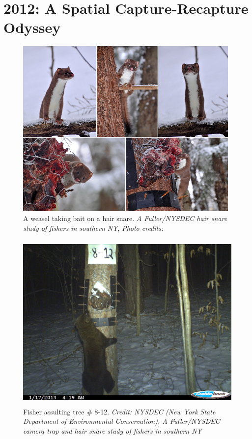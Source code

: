 


\chapter{
 2012: A Spatial Capture-Recapture Odyssey
 }

\label{chapt.final}

\vspace{0.3cm}


\vspace{2in}



\begin{figure}[h!]
\centering
\includegraphics[height=3.5in]{Ch20-Last/Chp20picturearray.jpg}
\caption{
A weasel taking bait on a hair snare.
{\it A Fuller/NYSDEC hair snare study of fishers in
southern NY}, {\it Photo credits: }
}
\label{last.fig.weasels}
\end{figure}


\begin{figure}[h!]
\centering
\includegraphics[height=3.5in]{Ch20-Last/fisher.jpg}
\caption{
Fisher assulting tree \# 8-12.
{\it Credit: NYSDEC (New York State Department of Environmental Conservation),
A Fuller/NYSDEC camera trap and hair snare study of fishers in
southern NY}
}
\label{last.fig.fisher}
\end{figure}


